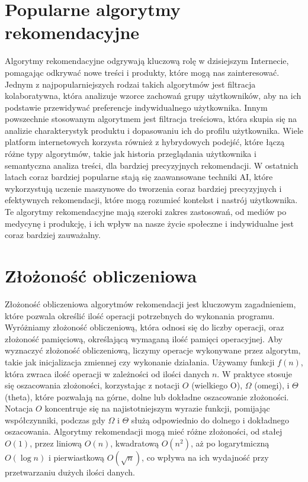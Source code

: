 \documentclass{article}
\begin{document}
\section{Popularne algorytmy rekomendacyjne}

Algorytmy rekomendacyjne odgrywają kluczową rolę w dzisiejszym Internecie, pomagając odkrywać nowe treści i produkty, które mogą nas zainteresować. Jednym z najpopularniejszych 
rodzai takich algorytmów jest filtracja kolaboratywna, która analizuje wzorce zachowań grupy użytkowników, aby na ich podstawie przewidywać preferencje indywidualnego użytkownika. 
Innym powszechnie stosowanym algorytmem jest filtracja treściowa, która skupia się na analizie charakterystyk produktu i dopasowaniu ich do profilu użytkownika.\newline
Wiele platform internetowych korzysta również z hybrydowych podejść, które łączą różne typy algorytmów, takie jak historia przeglądania użytkownika i semantyczna analiza treści, 
dla bardziej precyzyjnych rekomendacji. W ostatnich latach coraz bardziej popularne stają się zaawansowane techniki AI, które wykorzystują uczenie maszynowe do tworzenia coraz 
bardziej precyzyjnych i efektywnych rekomendacji, które mogą rozumieć kontekst i nastrój użytkownika.
Te algorytmy rekomendacyjne mają szeroki zakres zastosowań, od mediów po medycynę i produkcję, i ich wpływ na nasze życie społeczne i indywidualne jest coraz bardziej zauważalny. 

\section{Złożoność obliczeniowa}

Złożoność obliczeniowa algorytmów rekomendacji jest kluczowym zagadnieniem, które pozwala określić ilość operacji potrzebnych do wykonania programu. Wyróżniamy złożoność obliczeniową, 
która odnosi się do liczby operacji, oraz złożoność pamięciową, określającą wymaganą ilość pamięci operacyjnej. Aby wyznaczyć złożoność obliczeniową, liczymy operacje wykonywane 
przez algorytm, takie jak inicjalizacja zmiennej czy wykonanie działania. Używamy funkcji $f(n)$, która zwraca ilość operacji w zależności od ilości danych $n$. \newline 
W praktyce stosuje się oszacowania złożoności, korzystając z notacji $O$ (wielkiego O), $\Omega$ (omegi), i $\Theta$ (theta), które pozwalają na górne, dolne lub dokładne oszacowanie 
złożoności. Notacja $O$ koncentruje się na najistotniejszym wyrazie funkcji, pomijając współczynniki, podczas gdy $\Omega$ i $\Theta$ służą odpowiednio do dolnego i dokładnego oszacowania. 
Algorytmy rekomendacji mogą mieć różne złożoności, od stałej $O(1)$, przez liniową $O(n)$, kwadratową $O(n^2)$, aż po logarytmiczną $O(\log n)$ i pierwiastkową $O(\sqrt{n})$, 
co wpływa na ich wydajność przy przetwarzaniu dużych ilości danych.
\end{document}
